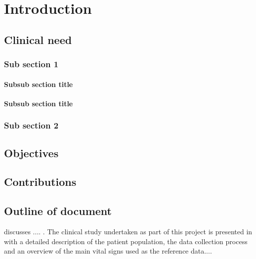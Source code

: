 \chapter{Introduction}
\label{chapter:introduction}


\lipsum[1-7]

\section{Clinical need}

\lipsum[1-2]\cite{HidalgoEquivitalEQ02Online,poh2011advancements,poh2010non,verkruysse2008remote,wieringa2005contactless,wiki:bayerfilter,nonin9560oem,Mas_Fernandez_2003,hartley2003multiple}

\subsection{Sub section 1}

\lipsum[3-6]\cite{schmidt1997animal,4036907,Orbanz2008,varjavand2002interactive,report:PCESC2005,HSU_05_2012,collins2015relating,abdi2010principal}

\subsubsection{Subsub section title}

\lipsum[3-5]

\subsubsection{Subsub section title}

\lipsum[8-10]

\subsection{Sub section 2}

\lipsum[10-12]\cite{cote1988effect,aravindhan2000sulfhemoglobinemia,clayton1991pulse,clayton1991comparison,webb1991potential,212885,964165,Chaichulee2017FG}

\section{Objectives}

\lipsum[2-4]

\section{Contributions}

\lipsum[2-4]

\section{Outline of document}

 discusses .... . The clinical study undertaken as part of this project is presented in  with a detailed description of the patient population, the data collection process and an overview of the main vital signs used as the reference data....

\lipsum[2-4]
